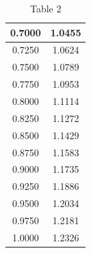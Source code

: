 \documentclass[a4paper,11pt]{article}
\begin{document}
\begin{table}[H]
\begin{subtable}[t]{.5\textwidth}
\begin{adjustbox}{height =9cm ,center}
\begin{tabular}{|c|c|}
\hline                    
0.7000 & 1.0455 \\        
\hline                    
0.7250 & 1.0624 \\        
\hline                    
0.7500 & 1.0789 \\        
\hline                    
0.7750 & 1.0953 \\        
\hline                    
0.8000 & 1.1114 \\        
\hline                    
0.8250 & 1.1272 \\        
\hline                    
0.8500 & 1.1429 \\        
\hline                    
0.8750 & 1.1583 \\        
\hline                    
0.9000 & 1.1735 \\        
\hline                    
0.9250 & 1.1886 \\        
\hline                    
0.9500 & 1.2034 \\        
\hline                    
0.9750 & 1.2181 \\        
\hline                    
1.0000 & 1.2326 \\                  
\hline                    
\end{tabular}        
\end{adjustbox}       
\caption{Table 2}  
\label{table:Q3}
\end{subtable}               
\end{table}



\end{document}
